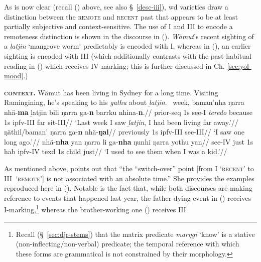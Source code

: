 As is now clear (recall () above, see also \S~\ref{desc-iii}), \gls{wd} varieties draw a distinction between the \textsc{remote} and \textsc{recent} past that appears to be at least partially subjective and context-sensitive. The use of \gls{I} and \gls{III} to encode a remoteness distinction is shown in the discourse in (). \textit{Wämut}'s recent sighting of a \textit{ḻatjin} `mangrove worm' predictably is encoded with \gls{I}, whereas in (), an earlier sighting is encoded with \gls{III} (which additionally contrasts with the past-habitual  reading in () which receives \gls{IV}-marking; this is further discussed in Ch. \ref{sec:yol-mood}.)



\pex\textbf{\textsc{context.}} Wämut has been living in Sydney for a long time. Visiting Ramingining, he's speaking to his \textit{gathu} about \textit{ḻatjin}.
\a\begingl\gla {}~week, baman'nha ŋarra nhä-\textbf{ma} ḻatjin bili ŋarra ga-\textbf{n} barrku nhina-\textbf{n}.//
\glb prior-\gls{seq} 1s see-\gls{I} \textsl{teredo} because 1s \gls{ipfv}-\gls{III} far sit-\gls{III}//
\glft`Last week I saw \textit{ḻatjin}, I had been living far away.'//\endgl
\a\begingl\gla ŋäthil/baman' ŋarra ga-\textbf{n} nhä-\textbf{ŋal}//
\glb previously 1s \gls{ipfv}-\gls{III} see-\gls{III}//
\glft`I saw one long ago.'//\endgl
\a\begingl\gla nhä-\textbf{nha} yan ŋarra li ga-\textbf{nha} ŋunhi ŋarra yothu yan//
\glb see-\gls{IV} just 1s \gls{hab} \gls{ipfv}-\gls{IV} \gls{texd} 1s child just//
\glft`I used to see them when I was a kid.'\trailingcitation{[AW~20190422]}//\endgl\xe




 As mentioned above, \citet[343]{Wilkinson1991} points out that ``the ``switch-over'' point [from \gls{I} `\textsc{recent}' to \gls{III}~\textsc{`remote'}] is not associated with an absolute time.'' She provides the examples reproduced here in (). Notable is the fact that, while both discourses are making reference to events that happened last year, the father-dying event in () receives \gls{I}-marking,\footnote{Recall (\S~\ref{sec:djr-stems}) that the matrix predicate \textit{marŋgi} `know' is a stative (non-inflecting/non-verbal) predicate; the temporal reference with which these forms are grammatical is not constrained by their morphology.} whereas the brother-working one () receives \gls{III}.

